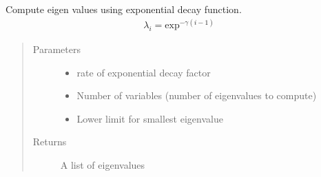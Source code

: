 \documentclass[letterpaper,10pt,english]{sphinxmanual}
\begin{document}

\begin{fulllineitems}
\label{\detokenize{Utilities:pysimrel.utilities.get_eigen}}
Compute eigen values using exponential decay function.
\begin{equation*}
\begin{split}\lambda_i = \text{exp}^{-\gamma(i-1)}\end{split}
\end{equation*}\begin{quote}\begin{description}
\item[{Parameters}] \leavevmode\begin{itemize}
\item {} 
 \textendash{} rate of exponential decay factor

\item {} 
 \textendash{} Number of variables (number of eigenvalues to compute)

\item {} 
 \textendash{} Lower limit for smallest eigenvalue

\end{itemize}

\item[{Returns}] \leavevmode
A list of eigenvalues

\end{description}\end{quote}

\end{fulllineitems}

\end{document}
